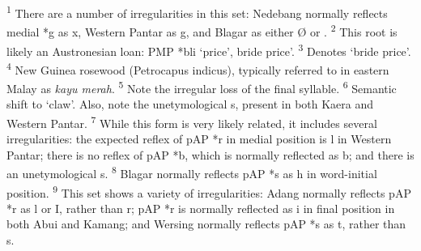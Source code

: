 \raggedright

\textsuperscript{1} There are a number of irregularities in this set: Nedebang normally reflects medial *g as x, Western Pantar as g{\textlengthmark}, and Blagar as either {\O} or {\textglotstop}.\textsuperscript{  2} This root is likely an Austronesian loan: PMP *b{\textschwa}li `price', bride price'.  \textsuperscript{3} Denotes `bride price'.  \textsuperscript{4} New Guinea rosewood (Petrocapus indicus), typically referred to in eastern Malay as \textit{kayu merah}.  \textsuperscript{5} Note the irregular loss of the final syllable.  \textsuperscript{6} Semantic shift to `claw'. Also, note the unetymological s, present in both Kaera and Western Pantar.  \textsuperscript{7} While this form is very likely related, it includes several irregularities: the expected reflex of pAP *r in medial position is l in Western Pantar; there is no reflex of pAP *b, which is normally reflected as b; and there is an unetymological s.  \textsuperscript{8} Blagar normally reflects pAP *s as h in word-initial position.  \textsuperscript{9} This set shows a variety of irregularities: Adang normally reflects pAP *r as l or I, rather than r; pAP *r is normally reflected as i in final position in both Abui and Kamang; and Wersing normally reflects pAP *s as t, rather than s.




